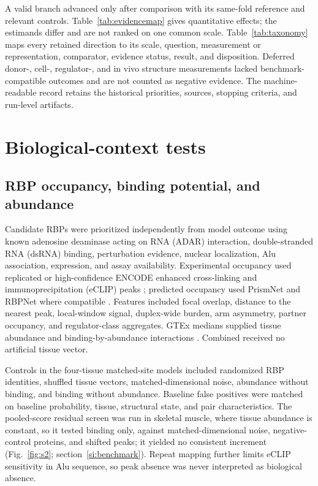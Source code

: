 \documentclass[9pt,twoside]{pnas-new}
\begin{document}
A valid branch advanced only after comparison with its same-fold reference and relevant controls. Table~\ref{tab:evidencemap} gives quantitative effects; the estimands differ and are not ranked on one common scale. Table~\ref{tab:taxonomy} maps every retained direction to its scale, question, measurement or representation, comparator, evidence status, result, and disposition. Deferred donor-, cell-, regulator-, and in vivo structure measurements lacked benchmark-compatible outcomes and are not counted as negative evidence. The machine-readable record retains the historical priorities, sources, stopping criteria, and run-level artifacts.

\section{Biological-context tests}\label{si:biological-context}

\subsection*{RBP occupancy, binding potential, and abundance}

Candidate RBPs were prioritized independently from model outcome using known adenosine deaminase acting on RNA (ADAR) interaction, double-stranded RNA (dsRNA) binding, perturbation evidence, nuclear localization, Alu association, expression, and assay availability. Experimental occupancy used replicated or high-confidence ENCODE enhanced cross-linking and immunoprecipitation (eCLIP) peaks \cite{VanNostrand2020}; predicted occupancy used PrismNet and RBPNet where compatible \cite{Sun2021PrismNet,Horlacher2023RBPNet}. Features included focal overlap, distance to the nearest peak, local-window signal, duplex-wide burden, arm asymmetry, partner occupancy, and regulator-class aggregates. GTEx medians supplied tissue abundance and binding-by-abundance interactions \cite{GTEx2020}. Combined received no artificial tissue vector.

Controls in the four-tissue matched-site models included randomized RBP identities, shuffled tissue vectors, matched-dimensional noise, abundance without binding, and binding without abundance. Baseline false positives were matched on baseline probability, tissue, structural state, and pair characteristics. The pooled-score residual screen was run in skeletal muscle, where tissue abundance is constant, so it tested binding only, against matched-dimensional noise, negative-control proteins, and shifted peaks; it yielded no consistent increment (Fig.~\ref{fig:s2}; section~\ref{si:benchmark}). Repeat mapping further limits eCLIP sensitivity in Alu sequence, so peak absence was never interpreted as biological absence.
\end{document}
